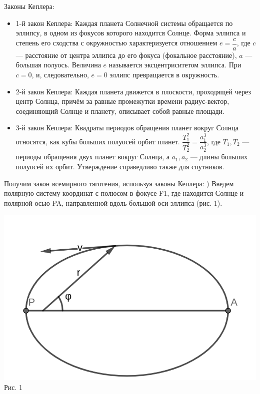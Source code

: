 \documentclass[12pt,a4paper,fleqn]{article}
\begin{document}
\begin{center}
Законы Кеплера:
\end{center}
\begin{itemize}
\item 1-й закон Кеплера: \newline
Каждая планета Солнечной системы обращается по эллипсу, в одном из фокусов которого находится Солнце. Форма эллипса и степень его сходства с окружностью характеризуется отношением $e=\dfrac{c}{a}$, где $c$ — расстояние от центра эллипса до его фокуса (фокальное расстояние), $a$ — большая полуось. Величина $e$ называется эксцентриситетом эллипса. При $c = 0$, и, следовательно, $e = 0$ эллипс превращается в окружность.
\item 2-й закон Кеплера: \newline
Каждая планета движется в плоскости, проходящей через центр Солнца, причём за равные промежутки времени радиус-вектор, соединяющий Солнце и планету, описывает собой равные площади.
\item 3-й закон Кеплера: \newline
Квадраты периодов обращения планет вокруг Солнца относятся, как кубы больших полуосей орбит планет. \newline
$\dfrac{T_1^2}{T_2^2} = \dfrac{a_1^3}{a_2^3}$, \newline
где $T_1, T_2$ — периоды обращения двух планет вокруг Солнца, а $a_1, a_2$ — длины больших полуосей их орбит. Утверждение справедливо также для спутников.
\end{itemize}
Получим закон всемирного тяготения, используя законы Кеплера: ) Введем полярную систему координат с полюсом в фокусе F1, где находится Солнце и полярной осью PA, направленной вдоль большой оси эллипса (рис. 1).
\begin{center}
\includegraphics[scale=0.8]{geogebra-export .png}
Рис. 1
\end{center}
\end{document}
